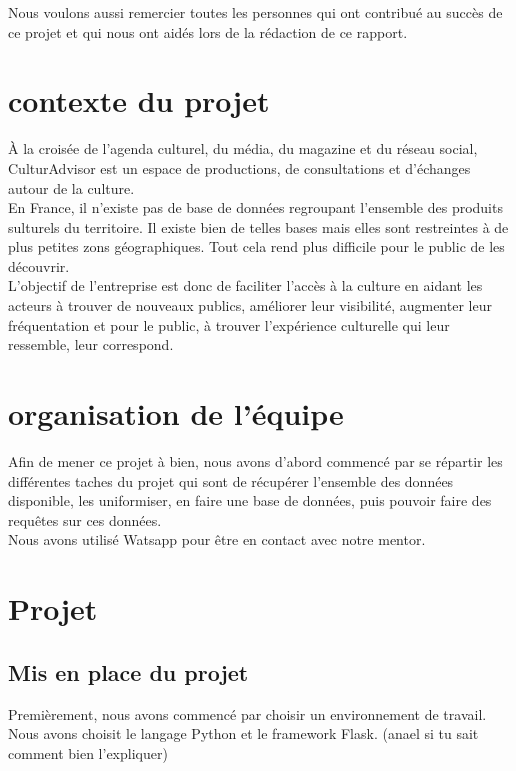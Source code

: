 \documentclass{article} %
\begin{document}
Nous voulons aussi remercier toutes les personnes qui ont contribué au succès de ce projet et qui nous ont aidés lors de la rédaction de ce rapport.
\newpage
\tableofcontents
\newpage %
\section{contexte du projet}
À la croisée de l’agenda culturel, du média, du magazine et du réseau social, CulturAdvisor est un espace de productions, de consultations et d’échanges autour de la culture. \\
En France, il n'existe pas de base de données regroupant l'ensemble des produits sulturels du territoire. Il existe bien de telles bases mais elles sont restreintes à de plus petites zons géographiques. Tout cela rend plus difficile pour le public de les découvrir. \\
L'objectif de l'entreprise est donc de faciliter l’accès à la culture en aidant les acteurs à trouver de nouveaux publics, améliorer leur visibilité, augmenter leur fréquentation et pour le public, à trouver l’expérience culturelle qui leur ressemble, leur correspond.


\section{organisation de l'équipe}
Afin de mener ce projet à bien, nous avons d'abord commencé par se répartir les différentes taches du projet qui sont de récupérer l'ensemble des données disponible, les uniformiser, en faire une base de données, puis pouvoir faire des requêtes sur ces données.\\
Nous avons utilisé Watsapp pour être en contact avec notre mentor.


\section{Projet}


\subsection{Mis en place du projet}
Premièrement, nous avons commencé par choisir un environnement de travail.\\
Nous avons choisit le langage Python et le framework Flask. (anael si tu sait comment bien l'expliquer)
\end{document}
